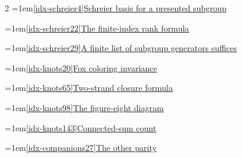 \begin{multicols}{2}
\noindent\hangindent=1em\hyperref[idx-schreier4]{\ref*{idx-schreier4}\enspace Schreier basis for a presented subgroup}\nobreak\dotfill\,\pageref{idx-schreier4}\par
\noindent\hangindent=1em\hyperref[idx-schreier22]{\ref*{idx-schreier22}\enspace The finite-index rank formula}\nobreak\dotfill\,\pageref{idx-schreier22}\par
\noindent\hangindent=1em\hyperref[idx-schreier29]{\ref*{idx-schreier29}\enspace A finite list of subgroup generators suffices}\nobreak\dotfill\,\pageref{idx-schreier29}\par
\par\addvspace{6pt}\par\nobreak
\noindent\hangindent=1em\hyperref[idx-knots20]{\ref*{idx-knots20}\enspace Fox coloring invariance}\nobreak\dotfill\,\pageref{idx-knots20}\par
\noindent\hangindent=1em\hyperref[idx-knots65]{\ref*{idx-knots65}\enspace Two-strand closure formula}\nobreak\dotfill\,\pageref{idx-knots65}\par
\noindent\hangindent=1em\hyperref[idx-knots98]{\ref*{idx-knots98}\enspace The figure-eight diagram}\nobreak\dotfill\,\pageref{idx-knots98}\par
\noindent\hangindent=1em\hyperref[idx-knots143]{\ref*{idx-knots143}\enspace Connected-sum count}\nobreak\dotfill\,\pageref{idx-knots143}\par
\par\addvspace{6pt}\par\nobreak
\noindent\hangindent=1em\hyperref[idx-companions27]{\ref*{idx-companions27}\enspace The other parity}\nobreak\dotfill\,\pageref{idx-companions27}\par
\end{multicols}
